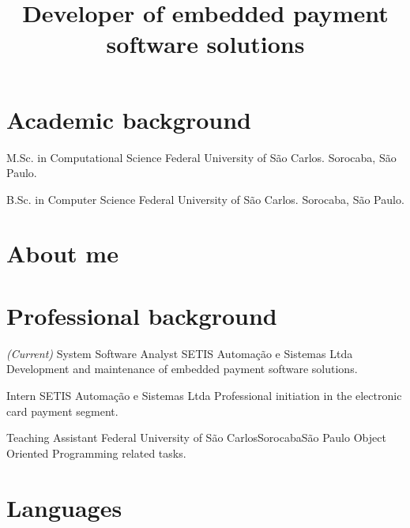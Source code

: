 \documentclass[11pt,a4paper,sans]{moderncv}
\title{\Large Developer of embedded payment software solutions}
\begin{document}
\maketitle

\section{Academic background}

{M.Sc. in Computational Science}
{}{}{}{Federal University of São Carlos. Sorocaba, São Paulo.}

{B.Sc. in Computer Science}
{}{}{}{Federal University of São Carlos. Sorocaba, São Paulo.}

\section{About me}


\section{Professional background}

{\textit{\small{(Current)}} System Software Analyst}
{SETIS Automação e Sistemas Ltda}{}{}
{Development and maintenance of embedded payment software solutions.}

{Intern}
{SETIS Automação e Sistemas Ltda}{}{}
{Professional initiation in the electronic card payment segment.}

{Teaching Assistant}
{Federal University of São Carlos}{Sorocaba}{São Paulo}
{Object Oriented Programming related tasks.}

\section{Languages}

\end{document}
